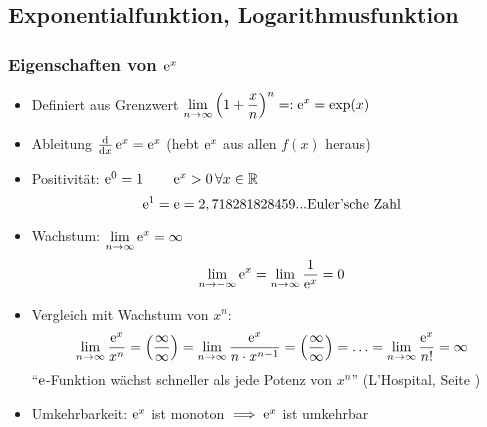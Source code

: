 \subsection{Exponentialfunktion, Logarithmusfunktion}
\subsubsection*{Eigenschaften von $\operatorname{e}^x$}
\begin{itemize}
    \item Definiert aus Grenzwert $\displaystyle\lim_{n \to \infty}\left(1+\frac{x}{n}\right)^n =: \operatorname{e}^x = \exp(x)$
    \item Ableitung $\frac{\mathrm d}{\mathrm d x}\operatorname{e}^x = \operatorname{e}^x$ (hebt $\operatorname{e}^x$ aus allen $f(x)$ heraus)
    \item Positivität: $\operatorname{e}^0 = 1 \qquad \operatorname{e}^x > 0 \, \forall x \in \mathbb{R}$
            \[\operatorname{e}^1=\operatorname{e}=2,718281828459... \text{Euler'sche Zahl}\]
    \item Wachstum: $\displaystyle\lim_{n \to \infty} \operatorname{e}^x = \infty$
            \[\lim_{n \to -\infty} \operatorname{e}^x = \lim_{n \to \infty} \frac{1}{\operatorname{e}^x} = 0\]
    \item Vergleich mit Wachstum von $x^n$:
        \begin{align*}
            \lim_{n \to \infty} \frac{\operatorname{e}^x}{x^n} = \left(\frac{\infty}{\infty}\right) = \lim_{n \to \infty}\frac{\operatorname{e}^x}{n\cdot x^{n-1}} = \left(\frac{\infty}{\infty}\right) = \ldots =  \lim_{n \to \infty}\frac{\operatorname{e}^x}{n!} = \infty
        \end{align*}
        "`$\operatorname{e}$-Funktion wächst schneller als jede Potenz von $x^n$"' (L'Hospital, Seite \pageref{theorem:hospital})
    \item Umkehrbarkeit: $\operatorname{e}^x$ ist monoton $\implies \operatorname{e}^x$ ist umkehrbar
\end{itemize}

\begin{center}
\end{center}

